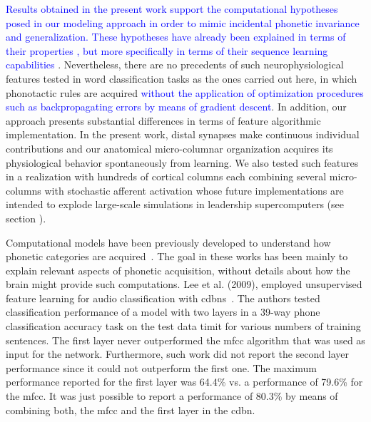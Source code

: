 \documentclass[10pt,letterpaper]{article}
\begin{document}
\textcolor{blue}{Results obtained in the present work support the computational hypotheses posed in our modeling approach in order to mimic incidental phonetic invariance and generalization.
These hypotheses have already been explained in terms of their properties \cite{hawkins_2016}, but more specifically in terms of their sequence learning capabilities \cite{cui_2016}}.
Nevertheless, there are no precedents of such neurophysiological features tested in word classification tasks as the ones carried out here, in which phonotactic rules are acquired \textcolor{blue}{without the application of optimization procedures such as backpropagating errors by means of gradient descent}. In addition, our approach presents substantial differences in terms of feature algorithmic implementation. In the present work, distal synapses make continuous individual contributions and our anatomical micro-columnar organization acquires its physiological behavior spontaneously from learning. We also tested such features in a realization with hundreds of cortical columns each combining several micro-columns with stochastic afferent activation whose future implementations are intended to explode large-scale simulations in leadership supercomputers (see section ).

Computational models have been previously developed to understand how phonetic categories are acquired~\cite{rasanen_2012}. The goal in these works has been mainly to explain relevant aspects of phonetic acquisition, without details about how the brain might provide such computations. 
Lee et al. (2009), employed unsupervised feature learning for audio classification with \glspl{cdbn}~\cite{Lee:2009:UFL:2984093.2984217}.
The authors tested classification performance of a model with two layers in a 39-way phone classification accuracy task on the test data \gls{timit} for various numbers of training sentences.
The first layer never outperformed the \gls{mfcc} algorithm that was used as input for the network.
Furthermore, such work did not report the second layer performance since it could not outperform the first one.
The maximum performance reported for the first layer was 64.4\% vs. a performance of 79.6\% for the \gls{mfcc}.
It was just possible to report a performance of 80.3\% by means of combining both, the \gls{mfcc} and the first layer in the \gls{cdbn}.
\end{document}
